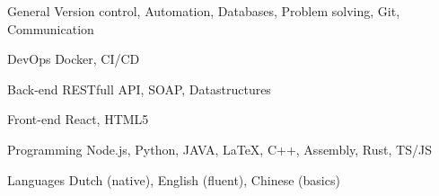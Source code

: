 

\begin{cvskills}

  \cvskill
    {General} %
    {Version control, Automation, Databases, Problem solving, Git, Communication} %

    \cvskill
    {DevOps} %
    {Docker, CI/CD} %

  \cvskill
    {Back-end} %
    {RESTfull API, SOAP, Datastructures} %

  \cvskill
    {Front-end} %
    {React, HTML5} %

  \cvskill
    {Programming} %
    {Node.js, Python, JAVA, LaTeX, C++, Assembly, Rust, TS/JS} %

  \cvskill
    {Languages} %
    {Dutch (native), English (fluent), Chinese (basics)} %

\end{cvskills}
